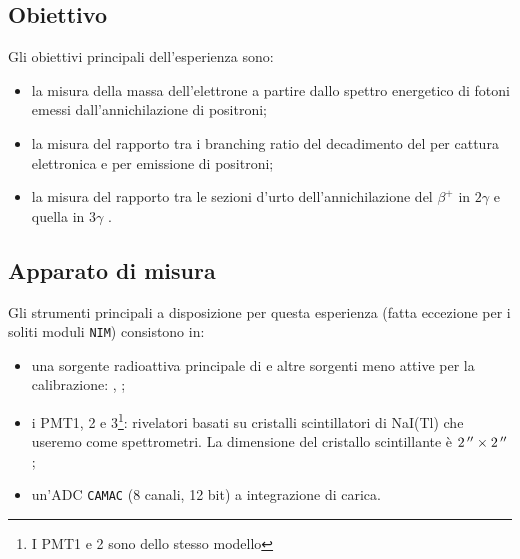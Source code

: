 \subsection{Obiettivo}
Gli obiettivi principali dell'esperienza sono:
\begin{itemize}
	\item la misura della massa dell'elettrone a partire dallo spettro energetico di fotoni emessi dall'annichilazione di positroni;
	\item la misura del rapporto tra i branching ratio del decadimento del  \na\; per cattura elettronica e per emissione di positroni;
	\item la misura del rapporto tra le sezioni d'urto dell'annichilazione del $\beta^+$ in $2\gamma$ e quella in $3\gamma$ .
\end{itemize}

\subsection{Apparato di misura}
Gli strumenti principali a disposizione per questa esperienza (fatta eccezione per i soliti moduli \texttt{NIM}) consistono in:
\begin{itemize}
	\item una sorgente radioattiva principale di \na\; e altre sorgenti meno attive per la calibrazione: \cs\;, \co\;;
	\item i PMT1, 2 e 3\footnote{I PMT1 e 2 sono dello stesso modello}: rivelatori basati su cristalli scintillatori di NaI(Tl) che useremo come spettrometri. La dimensione del cristallo scintillante è $\SI2{''}\times\SI2{''}$;
	\item un'ADC \texttt{CAMAC} (8 canali, 12 bit) a integrazione di carica.
\end{itemize}


